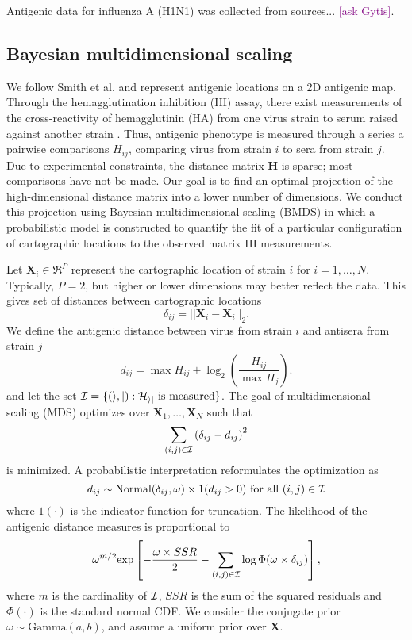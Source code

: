 \documentclass[11pt,oneside,letterpaper]{article}
\def\tbc#1{\textcolor{purple}{[#1]}}
\begin{document}
Antigenic data for influenza A (H1N1) was collected from sources... \tbc{ask Gytis}.

\subsection*{Bayesian multidimensional scaling}

We follow Smith et al. \cite{Smith04} and represent antigenic locations on a 2D antigenic map. Through the
hemagglutination inhibition (HI) assay, there exist measurements of the cross-reactivity of hemagglutinin (HA)
from one virus strain to serum raised against another strain \cite{Hirst43}. Thus, antigenic phenotype is
measured through a series a pairwise comparisons $H_{ij}$, comparing virus from strain $i$ to sera from strain
$j$. Due to experimental constraints, the distance matrix $\mathbf{H}$ is sparse; most comparisons have not be
made. Our goal is to find an optimal projection of the high-dimensional distance matrix into a lower number of
dimensions. We conduct this projection using Bayesian multidimensional scaling (BMDS) \cite{Oh01} in which a
probabilistic model is constructed to quantify the fit of a particular configuration of cartographic locations
to the observed matrix HI measurements.

Let $\mathbf{X}_i \in \Re^{P}$ represent the cartographic location of strain $i$ for $i = 1,\ldots, N$.
Typically, $P = 2$, but higher or lower dimensions may better reflect the data.  This gives set of distances
between cartographic locations 
\begin{equation}
	\delta_{ij} =  || \mathbf{X}_i - \mathbf{X}_i ||_2.
\end{equation}
We define the antigenic distance between virus from strain $i$ and antisera from strain $j$
\begin{equation}
	d_{ij} =  \max{ H_{ij} } + 
	\log_2 \left(   
		\frac{ H_{ij} }{ \max{ H_j } }
	\right).
\end{equation}
and let the set $\cal I = \{ (i,j) : H_{ij} \mbox{ is measured} \}$.
The goal of multidimensional scaling (MDS) optimizes over $\mathbf{X}_1,\ldots,\mathbf{X}_N$ such that
\begin{equation}
	\sum_{(i,j) \in \cal I} 
	\left(
		\delta_{ij} - d_{ij}
	\right)^2
\end{equation}
is minimized. 
A probabilistic interpretation reformulates the optimization as
\begin{equation} 
d_{ij} \sim \mbox{Normal}( \delta_{ij}, \omega ) \times 1( d_{ij} > 0 ) \mbox{ for all } (i,j) \in \cal I
\end{equation}
where $1 ( \cdot )$ is the indicator function for truncation. The likelihood of the antigenic distance
measures is proportional to
\begin{equation}
\omega^{m/2} \mbox{exp} \left[
- \frac{\omega \times SSR}{2} - \sum_{(i,j) \in \cal I} \log \Phi (\omega \times \delta_{ij})
\right],
\end{equation}
where $m$ is the cardinality of $\cal I$, $SSR$ is the sum of the squared residuals and $\Phi(\cdot)$ is the
standard normal CDF. We consider the conjugate prior $\omega \sim \mbox{Gamma}(a, b)$, and assume a uniform
prior over $\mathbf{X}$.
\end{document}
